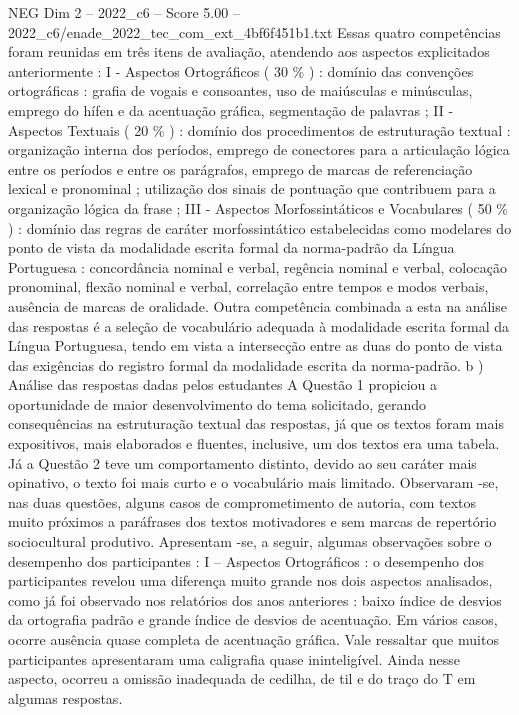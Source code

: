 \begin{textsample}{NEG Dim 2 – 2022\_c6 – Score 5.00 – 2022\_c6/enade\_2022\_tec\_com\_ext\_4bf6f451b1.txt}
Essas quatro competências foram reunidas em três itens de avaliação, atendendo aos aspectos explicitados anteriormente : I - Aspectos Ortográficos ( 30 \% ) : domínio das convenções ortográficas : grafia de vogais e consoantes, uso de maiúsculas e minúsculas, emprego do hífen e da acentuação gráfica, segmentação de palavras ; II - Aspectos Textuais ( 20 \% ) : domínio dos procedimentos de estruturação textual : organização interna dos períodos, emprego de conectores para a articulação lógica entre os períodos e entre os parágrafos, emprego de marcas de referenciação lexical e pronominal ; utilização dos sinais de pontuação que contribuem para a organização lógica da frase ; III - Aspectos Morfossintáticos e Vocabulares ( 50 \% ) : domínio das regras de caráter morfossintático estabelecidas como modelares do ponto de vista da modalidade escrita formal da norma-padrão da Língua Portuguesa : concordância nominal e verbal, regência nominal e verbal, colocação pronominal, flexão nominal e verbal, correlação entre tempos e modos verbais, ausência de marcas de oralidade.
Outra competência combinada a esta na análise das respostas é a seleção de vocabulário adequada à modalidade escrita formal da Língua Portuguesa, tendo em vista a intersecção entre as duas do ponto de vista das exigências do registro formal da modalidade escrita da norma-padrão. b ) Análise das respostas dadas pelos estudantes A Questão 1 propiciou a oportunidade de maior desenvolvimento do tema solicitado, gerando consequências na estruturação textual das respostas, já que os textos foram mais expositivos, mais elaborados e fluentes, inclusive, um dos textos era uma tabela.
Já a Questão 2 teve um comportamento distinto, devido ao seu caráter mais opinativo, o texto foi mais curto e o vocabulário mais limitado.
Observaram -se, nas duas questões, alguns casos de comprometimento de autoria, com textos muito próximos a paráfrases dos textos motivadores e sem marcas de repertório sociocultural produtivo.
Apresentam -se, a seguir, algumas observações sobre o desempenho dos participantes : I – Aspectos Ortográficos : o desempenho dos participantes revelou uma diferença muito grande nos dois aspectos analisados, como já foi observado nos relatórios dos anos anteriores : baixo índice de desvios da ortografia padrão e grande índice de desvios de acentuação.
Em vários casos, ocorre ausência quase completa de acentuação gráfica.
Vale ressaltar que muitos participantes apresentaram uma caligrafia quase ininteligível.
Ainda nesse aspecto, ocorreu a omissão inadequada de cedilha, de til e do traço do T em algumas respostas.

\end{textsample}
